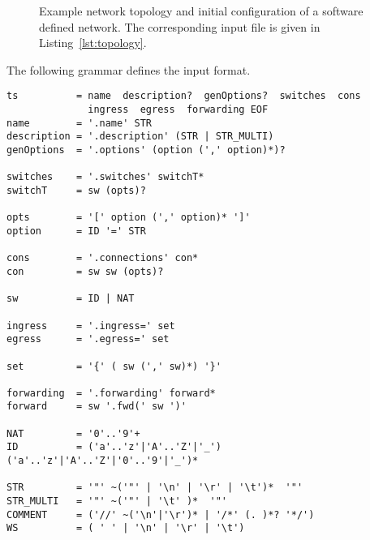 \documentclass[12pt,twoside,a4paper,openright]{memoir}
\begin{document}
\begin{figure}[t]
\begin{subfigure}[t]{0.49\textwidth}
		\label{fig:initConf}
	\end{subfigure}%
	\caption{Example network topology and initial configuration of a software defined network. The corresponding input file
is given in Listing~\ref{lst:topology}.
	}
	\label{fig:topology}
\end{figure}
The following grammar defines the input format.
\begin{lstlisting}[captionpos=b, caption=Grammar of the topology and the initial configuration of SDNs., label = lst:grammar,language=ebnf]
ts			= name  description?  genOptions?  switches  cons
			  ingress  egress  forwarding EOF
name		= '.name' STR
description	= '.description' (STR | STR_MULTI)
genOptions  = '.options' (option (',' option)*)?

switches	= '.switches' switchT*
switchT		= sw (opts)?

opts		= '[' option (',' option)* ']'
option		= ID '=' STR

cons		= '.connections' con*
con			= sw sw (opts)?

sw			= ID | NAT

ingress     = '.ingress=' set
egress      = '.egress=' set

set         = '{' ( sw (',' sw)*) '}'

forwarding  = '.forwarding' forward*
forward     = sw '.fwd(' sw ')'

NAT         = '0'..'9'+
ID			= ('a'..'z'|'A'..'Z'|'_') ('a'..'z'|'A'..'Z'|'0'..'9'|'_')*

STR			= '"' ~('"' | '\n' | '\r' | '\t')*  '"'
STR_MULTI	= '"' ~('"' | '\t' )*  '"'
COMMENT		= ('//' ~('\n'|'\r')* | '/*' (. )*? '*/')
WS		    = ( ' ' | '\n' | '\r' | '\t')
\end{lstlisting}
\end{document}
